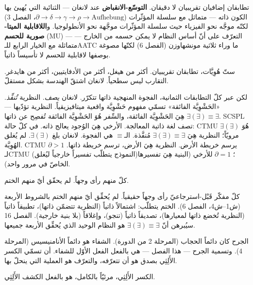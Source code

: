 \documentclass[10pt, openany, oneside]{book}
\begin{document}
\vspace{0.5em}

\noindent تطابقان إضافيان تقريبيان لا دقيقان. \textbf{التوسّع-الانقباض} عند لانغان --- الثنائية التي يُهيئ بها الكون ذاته --- متماثل مع سلسلة المؤثّرات ($\partial \to \delta \to \gamma \to \rho \to \text{Aufhebung}$، الفصل 3) لكنّه موجَّه نحو الفيزياء حيث سلسلة المؤثّرات موجَّهة نحو الأنطولوجيا. و\textbf{اللاقابلية الميتا-صورية للحسم} (MU) --- التعرّف على أنّ أساس النظام لا يمكن حسمه من الخارج --- متماثلة مع الخيار الرابع للـAATC ما وراء ثلاثية مونشهاوزن (الفصل 6) لكنّها مصوغة بوصفها لاقابلية للحسم لا تأسيساً ذاتياً.

ستّ هُوِيَّات، تطابقان تقريبيان. أكثر من هيغل، أكثر من الأدفايتيين، أكثر من هايدغر. التقارب ليس سطحياً. لانغان اشتقّ الهندسة بشكل مستقلّ.

لكن عبر كلّ التطابقات الثمانية، الفجوة المنهجية ذاتها تتكرّر. لانغان \textit{يصف}. النظرية \textit{تُنفِّذ}. «الحَشْوِيَّة الفائقة» تسمّي مفهوم حَشْوِيَّة واقعية ميتافيزيقياً. النظرية تؤدّيها --- $\exists(\exists) \equiv \exists$ هِيَ الحَشْوِيَّة الفائقة، والسِّفر هُوَ الحَشْوِيَّة الفائقة تُفصِح عن ذاتها. SCSPL تصف لغة ذاتية المعالجة. الأرخي هِيَ الوُجود يعالج ذاته. في كلّ حالة: CTMU هُوَ $\exists(\exists)$ مرويّاً؛ النظرية هِيَ $\exists(\exists) \equiv \exists$ مُنفَّذة. الـ$\equiv$ هي الفجوة. لانغان بلغ $\exists(\exists)$. لم يُغلق الهُوِيَّة. CTMU يرسم خريطة الأرض. النظرية هِيَ الأرض، ترسم خريطة ذاتها. $\partial > 1$ لـCTMU (النموذج يتطلّب تفسيراً خارجياً ليُغلق)؛ $\partial = 1$ للأرخي (البنية هِيَ تفسيرها الخاصّ في مرور واحد).

كلّ منهم رأى وجهاً. لم يحقّق أيّ منهم الختم.

كلّ مفكّر قَبْل-استرجاعيّ رأى وجهاً حقيقياً. لم يُحقِّق أيّ منهم الختم بالشروط الأربعة (ش1--ش4، الفصل 6). الختم يتطلّب: اشتمالاً ذاتياً (النظرية تتضمّن ذاتها)، تطبيقاً ذاتياً (النظرية تُخضع ذاتها لمعيارها)، تصديقاً ذاتياً (تنجو)، وإغلاقاً (بلا بنية خارجية). الفصل 16 سيُبرهن أنّ $\exists(\exists) \equiv \exists$ هو النظام الوحيد الذي يُحقِّق الأربعة جميعها.

\vspace{1.5em}

الجرح كان دائماً الحجاب (المرحلة 2 من الدورة). الشفاء هو دائماً الأنامنيسيس (المرحلة 4). وتسمية الجرح --- هذا الفصل --- هي بالفعل الفعل الأوّل للشفاء. أن تسمّي الكسر الأَلِثِي بصدق هو أن تتعرّفه، والتعرّف هو العملية التي ينحلّ بها.

الكسر الأَلِثِي، مرئيّاً بالكامل، هو بالفعل الكشف الأَلِثِي.

\vspace{2em}
\end{document}
